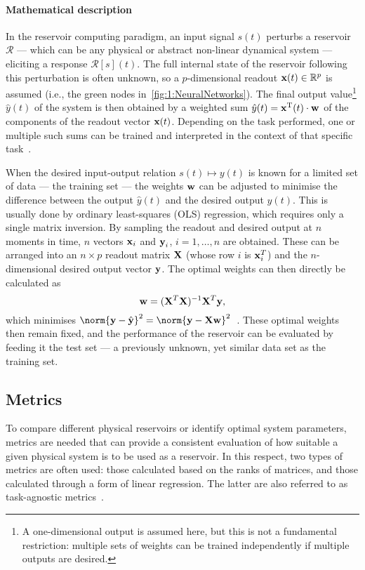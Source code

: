 \paragraph{Mathematical description}
In the reservoir computing paradigm, an input signal $s(t)$ perturbs a reservoir $\mathcal{R}$ --- which can be any physical or abstract non-linear dynamical system --- eliciting a response $\mathcal{R}[s](t)$.
The full internal state of the reservoir following this perturbation is often unknown, so a $p$-dimensional readout $\boldsymbol{\mathbf{x}}(t) \in \mathbb{R}^p$ is assumed (i.e., the green nodes in~\cref{fig:1:NeuralNetworks}).
The final output value\footnote{
	A one-dimensional output is assumed here, but this is not a fundamental restriction: multiple sets of weights can be trained independently if multiple outputs are desired.
} $\hat{y}(t)$ of the system is then obtained by a weighted sum $\hat{y}(t) = \boldsymbol{\mathbf{x}}^\mathrm{T}(t) \cdot \boldsymbol{\mathbf{w}}$ of the components of the readout vector $\boldsymbol{\mathbf{x}}(t)$.
Depending on the task performed, one or multiple such sums can be trained and interpreted in the context of that specific task~\cite{RC_RecentAdvances}. \par %
When the desired input-output relation $s(t) \mapsto y(t)$ is known for a limited set of data --- the training set --- the weights $\boldsymbol{\mathbf{w}}$ can be adjusted to minimise the difference between the output $\hat{y}(t)$ and the desired output $y(t)$.
This is usually done by ordinary least-squares (OLS) regression, which requires only a single matrix inversion.
By sampling the readout and desired output at $n$ moments in time, $n$ vectors $\boldsymbol{\mathbf{x}}_i$ and $\boldsymbol{\mathbf{y}}_i$, $i = 1, \dots, n$ are obtained.
These can be arranged into an $n \times p$ readout matrix $\boldsymbol{\mathbf{X}}$ (whose row $i$ is $\boldsymbol{\mathbf{x}}_i^T$) and the $n$-dimensional desired output vector $\boldsymbol{\mathbf{y}}$.
The optimal weights can then directly be calculated as
\begin{equation}
	\boldsymbol{\mathbf{w}} = (\boldsymbol{\mathbf{X}}^T \boldsymbol{\mathbf{X}})^{-1} \boldsymbol{\mathbf{X}}^T \boldsymbol{\mathbf{y}} \mathrm{,}
\end{equation}
which minimises $\norm{\vc{y} - \hat{\vc{y}}}^2 = \norm{\vc{y} - \vc{X}\vc{w}}^2$~\cite{RC_NNN}.
These optimal weights then remain fixed, and the performance of the reservoir can be evaluated by feeding it the test set --- a previously unknown, yet similar data set as the training set.

\subsection{Metrics} \label{sec:1:RC_metrics}
To compare different physical reservoirs or identify optimal system parameters, metrics are needed that can provide a consistent evaluation of how suitable a given physical system is to be used as a reservoir.
In this respect, two types of metrics are often used: those calculated based on the ranks of matrices, and those calculated through a form of linear regression.
The latter are also referred to as task-agnostic metrics~\cite{RC_TaskAgnosticMetrics}. %

